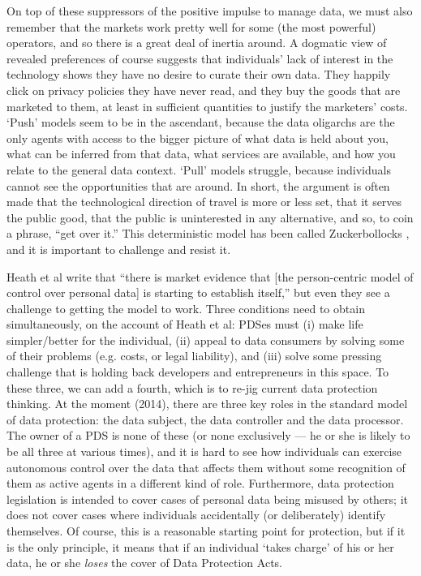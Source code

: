\documentclass{acm_proc_article-sp}
\begin{document}
On top of these suppressors of the positive impulse to manage data, we must also remember that the markets work pretty well for some (the most powerful) operators, and so there is a great deal of inertia around. A dogmatic view of revealed preferences of course suggests that individuals' lack of interest in the technology shows they have no desire to curate their own data. They happily click on privacy policies they have never read, and they buy the goods that are marketed to them, at least in sufficient quantities to justify the marketers' costs. `Push' models seem to be in the ascendant, because the data oligarchs are the only agents with access to the bigger picture of what data is held about you, what can be inferred from that data, what services are available, and how you relate to the general data context. `Pull' models struggle, because individuals cannot see the opportunities that are around. In short, the argument is often made that the technological direction of travel is more or less set, that it serves the public good, that the public is uninterested in any alternative, and so, to coin a phrase, ``get over it.'' This deterministic model has been called Zuckerbollocks \cite{ohara2013}, and it is important to challenge and resist it.


Heath et al write \cite{heath2013} that ``there is market evidence that [the person-centric model of control over personal data] is starting to establish itself,'' but even they see a challenge to getting the model to work. Three conditions need to obtain simultaneously, on the account of Heath et al: PDSes must (i) make life simpler/better for the individual, (ii) appeal to data consumers by solving some of their problems (e.g. costs, or legal liability), and (iii) solve some pressing challenge that is holding back developers and entrepreneurs in this space. To these three, we can add a fourth, which is to re-jig current data protection thinking. At the moment (2014), there are three key roles in the standard model of data protection: the data subject, the data controller and the data processor. The owner of a PDS is none of these (or none exclusively --- he or she is likely to be all three at various times), and it is hard to see how individuals can exercise autonomous control over the data that affects them without some recognition of them as active agents in a different kind of role. Furthermore, data protection legislation is intended to cover cases of personal data being misused by others; it does not cover cases where individuals accidentally (or deliberately) identify themselves. Of course, this is a reasonable starting point for protection, but if it is the only principle, it means that if an individual `takes charge' of his or her data, he or she {\em loses} the cover of Data Protection Acts.
\end{document}
